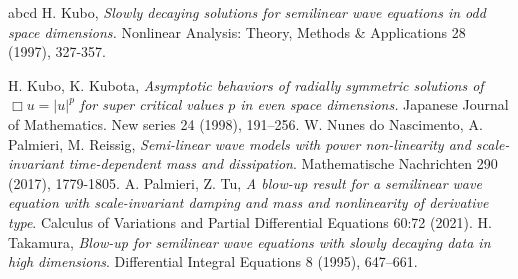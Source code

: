 \documentclass[11pt,reqno]{amsart}
\theoremstyle{definition}
\numberwithin{equation}{section}
\begin{document}
\begin{thebibliography}{abcd}
H. Kubo, {\em Slowly decaying solutions for semilinear wave equations in odd space dimensions.} Nonlinear Analysis: Theory, Methods \& Applications 28 (1997), 327-357.
	
H. Kubo, K. Kubota, {\em Asymptotic behaviors of radially symmetric solutions of  $\Box u=|u|^p$ for super critical values $p$ in even space dimensions.} Japanese Journal of Mathematics. New series 24 (1998), 191--256.
 W. Nunes do Nascimento, A. Palmieri, M. Reissig, {\it Semi-linear wave models with power non-linearity and scale-invariant time-dependent mass and dissipation}. Mathematische Nachrichten 290 (2017), 1779-1805.
 A. Palmieri, Z. Tu, {\it A blow-up result for a semilinear wave equation with scale-invariant damping and mass and nonlinearity of derivative type}.  Calculus of Variations and Partial Differential Equations  60:72 (2021).
 H. Takamura, {\it Blow-up for semilinear wave equations with slowly decaying data in high dimensions}. Differential Integral Equations 8 (1995), 647--661.


\end{thebibliography}

%
\end{document}

